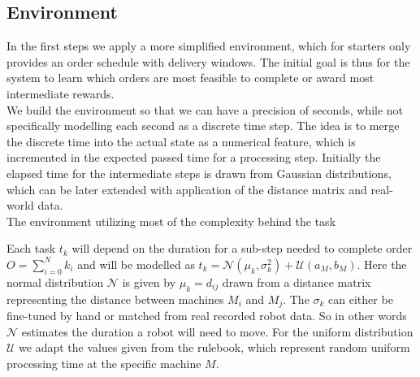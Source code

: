 \documentclass[runningheads,envcountsect]{llncs}
\begin{document}
\subsection{Environment} \label{env}
In the first steps we apply a more simplified environment, which for starters only provides an order schedule with delivery windows. The initial goal is thus for the system to learn which orders are most feasible to complete or award most intermediate rewards.\\
We build the environment so that we can have a precision of seconds, while not specifically modelling each second as a discrete time step. The idea is to merge the discrete time into the actual state as a numerical feature, which is incremented in the expected passed time for a processing step. Initially the elapsed time for the intermediate steps is drawn from Gaussian distributions, which can be later extended with application of the distance matrix and real-world data.\\
The environment utilizing most of the complexity behind the task 

Each task $t_k$ will depend on the duration for a sub-step needed to complete order $O=\sum_{i=0}^N k_i$ and will be modelled as $t_k = \mathcal{N}(\mu_k, \sigma_k^2) + \mathcal{U}(a_M,b_M)$. Here the normal distribution $\mathcal{N}$ is given by $\mu_k=d_{ij}$ drawn from a distance matrix representing the distance between machines $M_i$ and $M_j$. The $\sigma_k$ can either be fine-tuned by hand or matched from real recorded robot data. So in other words $\mathcal{N}$ estimates the duration a robot will need to move. For the uniform distribution $\mathcal{U}$ we adapt the values given from the rulebook, which represent random uniform processing time at the specific machine $M$.
\end{document}

